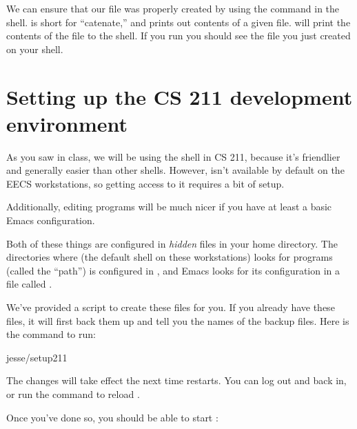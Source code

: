 \documentclass{tufte-handout}
\begin{document}
We can ensure that our file was properly created by using the
 command in the shell.  is short for
``catenate,'' and prints out contents of a given file.   will print the contents of the file to the shell. If
you run  you should see the file you just
created on your shell.

\section{Setting up the CS 211 development environment}

As you saw in class, we will be using the  shell in CS
211, because it’s friendlier and generally easier than other shells.
However,  isn’t available by default on the EECS
workstations, so getting access to it requires a bit of setup.

Additionally, editing programs will be much nicer if you have at least a
basic Emacs configuration.

Both of these things are configured in \emph{hidden} files in your home directory. The
directories where  (the default shell on these
workstations) looks for programs (called the ``path'') is configured in
, and Emacs looks for its configuration in a file
called .

We’ve provided a script to create these files for you. If you already
have these files, it will first back them up and tell you the names of
the backup files. Here is the command to run:

\begin{CmdLine*}
  \C \plaintilde jesse/setup211\\
\end{CmdLine*}


\noindent The changes will take effect the next time 
restarts. You can log out and back in, or run the command  to reload .

Once you’ve done so, you should be able to start :
\end{document}
